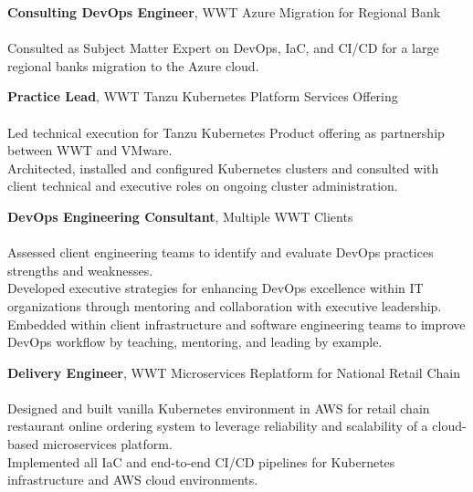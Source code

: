 \documentclass[letterpaper]{article}
\begin{document}
{\textbf{Consulting DevOps Engineer}, WWT Azure Migration for Regional Bank } \\
\hspace{5mm}{\sl (Microsoft Azure, Azure DevOps, Terraform, Ansible)} \\
Consulted as Subject Matter Expert on DevOps, IaC, and CI/CD for a large regional
  bank\textquotesingle{}s migration to the Azure cloud.\\
\vspace*{2mm}

{\textbf{Practice Lead}, WWT Tanzu Kubernetes Platform Services Offering} \\
\hspace{5mm}{\sl (VMware Tanzu Kubernetes Grid (TKG), Kubernetes, Terraform, Ansible, Helm,
  VMware ESX, Amazon AWS)} \\
Led technical execution for Tanzu Kubernetes Product offering as partnership
  between WWT and VMware. \\
Architected, installed and configured Kubernetes clusters and consulted with
  client technical and executive roles on ongoing cluster administration.\\
\vspace*{2mm}

{\textbf{DevOps Engineering Consultant}, Multiple WWT Clients} \\
\hspace{5mm}{\sl (The Three Ways, Theory of Constraints, The Five Pillars, SRE, Kaizen, Lean, Kanban, Scrum)} \\
Assessed client engineering teams to identify and evaluate DevOps practices
  strengths and weaknesses.\\
Developed executive strategies for enhancing DevOps excellence within IT
  organizations through mentoring and collaboration with executive leadership.
Embedded within client infrastructure and software engineering teams to improve
  DevOps workflow by teaching, mentoring, and leading by example.\\
\vspace*{2mm}

{\textbf{Delivery Engineer}, WWT Microservices Replatform for National Retail Chain} \\
\hspace{5mm}{\sl (Kubernetes, KOPS, Helm, Amazon AWS, Ansible, Terraform, GitLab CI, Packer, Docker, Jenkins, PostgreSQL)} \\
Designed and built vanilla Kubernetes environment in AWS for retail chain
  restaurant online ordering system to leverage reliability and scalability of
  a cloud-based microservices platform.\\
Implemented all IaC and end-to-end CI/CD pipelines for Kubernetes
  infrastructure and AWS cloud environments.\\
\vspace*{2mm}
\end{document}
